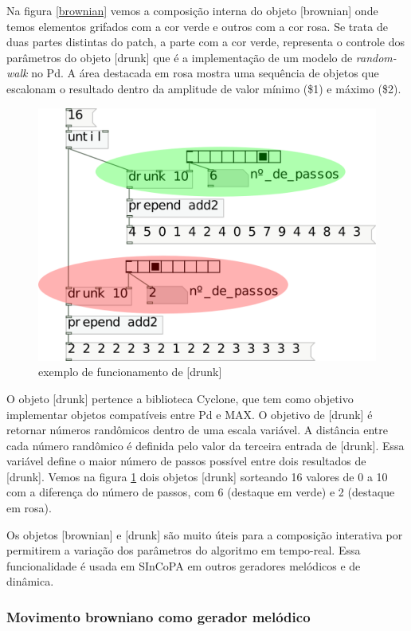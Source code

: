 \documentclass{ppgmus}
\begin{document}
Na figura \ref{brownian} vemos a composição interna do objeto [brownian] onde temos elementos
grifados com a cor verde e outros com a cor rosa. Se trata de duas partes
distintas do patch, a parte com a cor verde, representa o controle dos
parâmetros do objeto [drunk] que é a implementação de um modelo de \textit{random-walk}
no Pd. A área destacada em rosa mostra uma sequência de objetos que 
escalonam o resultado dentro da amplitude de valor mínimo (\$1) e máximo (\$2).

 \begin{figure}
\includegraphics[scale=.6]{drunk}
\caption{exemplo de funcionamento de [drunk]}
\label{drunk}
\end{figure} 

O objeto [drunk] pertence a biblioteca Cyclone, que tem como objetivo
implementar objetos compatíveis entre Pd e MAX. O objetivo de [drunk] é
retornar números randômicos dentro de uma escala variável. A distância
entre cada número randômico é definida pelo valor da terceira entrada
de [drunk]. Essa variável define o maior número de passos possível entre 
dois resultados de [drunk]. Vemos na figura \ref{drunk} 
dois objetos [drunk] sorteando 16 valores de 0 a 10 com a diferença do
número de passos, com 6 (destaque em verde) e 2 (destaque em rosa).

Os objetos [brownian] e [drunk] são muito úteis para a composição 
interativa por permitirem a variação dos parâmetros do algoritmo
em tempo-real. Essa funcionalidade é usada em SInCoPA em outros geradores
melódicos e de dinâmica.

\subsubsection{Movimento browniano como gerador melódico}
\end{document}
